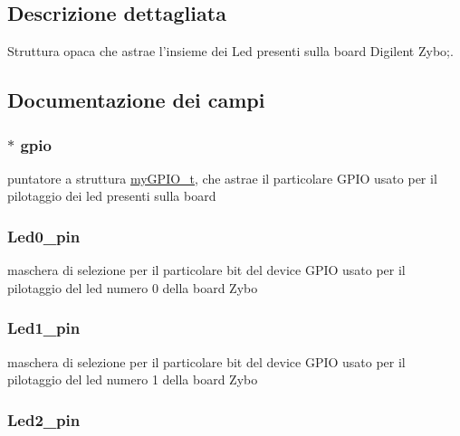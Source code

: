 \subsection{Descrizione dettagliata}
Struttura opaca che astrae l'insieme dei Led presenti sulla board Digilent Zybo;. 

\subsection{Documentazione dei campi}
\hypertarget{struct_zybo_led__t_ac37ddc7c58d246d233dfb38037020184}{
\subsubsection[{gpio}]{$\ast$ gpio}}\label{struct_zybo_led__t_ac37ddc7c58d246d233dfb38037020184}
puntatore a struttura \hyperlink{structmy_g_p_i_o__t}{my\+G\+P\+I\+O\+\_\+t}, che astrae il particolare G\+P\+I\+O usato per il pilotaggio dei led presenti sulla board \hypertarget{struct_zybo_led__t_ac5afef2eef91d5533a23435cfcc60104}{
\subsubsection[{Led0\+\_\+pin}]{ Led0\+\_\+pin}}\label{struct_zybo_led__t_ac5afef2eef91d5533a23435cfcc60104}
maschera di selezione per il particolare bit del device G\+P\+I\+O usato per il pilotaggio del led numero 0 della board Zybo \hypertarget{struct_zybo_led__t_adc78fb167f1dd6693910813d4ec5930e}{
\subsubsection[{Led1\+\_\+pin}]{ Led1\+\_\+pin}}\label{struct_zybo_led__t_adc78fb167f1dd6693910813d4ec5930e}
maschera di selezione per il particolare bit del device G\+P\+I\+O usato per il pilotaggio del led numero 1 della board Zybo \hypertarget{struct_zybo_led__t_a4213c78e5a02b1476222e989c2eceb04}{
\subsubsection[{Led2\+\_\+pin}]{ Led2\+\_\+pin}}\label{struct_zybo_led__t_a4213c78e5a02b1476222e989c2eceb04}
